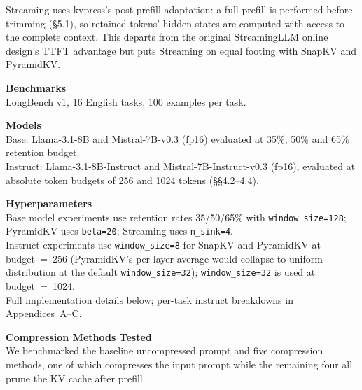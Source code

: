 \documentclass[10pt,letterpaper]{article}
\begin{document}
Streaming uses kvpress's post-prefill adaptation: a full prefill is
performed before trimming (§5.1), so retained tokens' hidden states are
computed with access to the complete context. This departs from the
original StreamingLLM online design's TTFT advantage but puts Streaming
on equal footing with SnapKV and PyramidKV.

\textbf{Benchmarks}
\\LongBench v1, 16 English tasks, 100 examples per task.

\textbf{Models}
\\Base: Llama-3.1-8B and Mistral-7B-v0.3 (fp16) evaluated at 35\%, 50\% and 65\% retention budget.
\\Instruct: Llama-3.1-8B-Instruct and Mistral-7B-Instruct-v0.3 (fp16), evaluated at absolute token budgets of 256 and 1024 tokens (§§4.2--4.4).

\textbf{Hyperparameters}
\\Base model experiments use retention rates 35/50/65\% with \texttt{window\_size=128}; PyramidKV uses \texttt{beta=20}; Streaming uses \texttt{n\_sink=4}.
\\Instruct experiments use \texttt{window\_size=8} for SnapKV and PyramidKV at budget~=~256 
(PyramidKV's per-layer average would collapse to uniform distribution at the default 
\texttt{window\_size=32}); \texttt{window\_size=32} is used at budget~=~1024.
\\Full implementation details below; per-task instruct breakdowns in Appendices~A--C.

\textbf{Compression Methods Tested}
\\We benchmarked the baseline uncompressed prompt and five compression methods,
one of which compresses the input prompt while the remaining four all prune the KV
cache after prefill.
\end{document}
